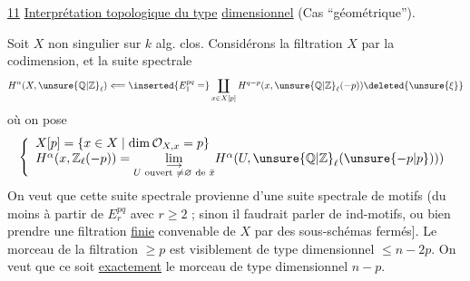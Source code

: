 \uline{11} \uline{Interprétation topologique du type}
 \uline{dimensionnel} (Cas ``géométrique'').

Soit $X$  non singulier sur $k$
alg. clos. Considérons la filtration $X$
par la codimension, et la suite spectrale
\[
H^n(X,\unsure{\mathbb{Q}|\mathbb{Z}}_\ell)
\Longleftarrow
\inserted{E_1^{pq}=}
\coprod_{x\in X[p]}H^{q-p}(x,\unsure{\mathbb{Q}|\mathbb{Z}}_\ell(-p))
\deleted{\unsure{\xi}}
\]
où on pose
\[
\left\{\begin{array}{l}
X[p]=\{x\in X\mid\dim\mathcal{O}_{X,x}=p\}\\
H^\alpha(x,\mathbb{Z}_\ell(-p))=
\underset{\substack{\longrightarrow\\
U\text{ ouvert }\ne\varnothing\text{ de }\bar{x}}}{\lim}
H^\alpha(U,\unsure{\mathbb{Q}|\mathbb{Z}}_\ell(\unsure{-p|p})))
\end{array}\right.
\]
On veut que  cette suite spectrale
provienne d'une suite spectrale de
motifs (du moins à partir de $E_r^{pq}$ avec
$r\geq2$ ; sinon il faudrait parler de
ind-motifs, ou bien prendre une
filtration \uline{finie} convenable de $X$ par des
sous-schémas fermés].
Le morceau
de la filtration $\geq p$ est visiblement de
type dimensionnel $\leq n-2p$. On veut que
ce soit \uline{exactement} le morceau de type
dimensionnel $n-p$.

